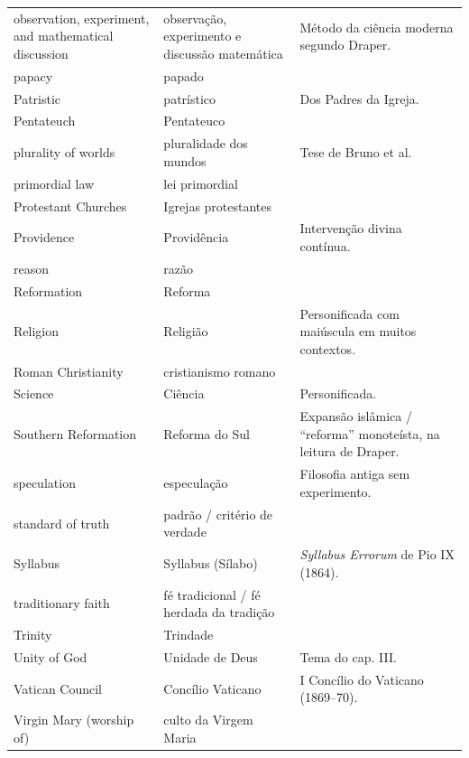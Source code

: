 \documentclass[11pt,a5paper,twoside,openany]{book}
\begin{document}
\begin{longtable}{p{} | p{} | p{}}
observation, experiment, and mathematical discussion & observação, experimento e discussão matemática & Método da ciência moderna segundo Draper. \\
papacy & papado &  \\
Patristic & patrístico & Dos Padres da Igreja. \\
Pentateuch & Pentateuco &  \\
plurality of worlds & pluralidade dos mundos & Tese de Bruno et al. \\
primordial law & lei primordial &  \\
Protestant Churches & Igrejas protestantes &  \\
Providence & Providência & Intervenção divina contínua. \\
reason & razão &  \\
Reformation & Reforma &  \\
Religion & Religião & Personificada com maiúscula em muitos contextos. \\
Roman Christianity & cristianismo romano &  \\
Science & Ciência & Personificada. \\
Southern Reformation & Reforma do Sul & Expansão islâmica / “reforma” monoteísta, na leitura de Draper. \\
speculation & especulação & Filosofia antiga sem experimento. \\
standard of truth & padrão / critério de verdade &  \\
Syllabus & Syllabus (Sílabo) & \textit{Syllabus Errorum} de Pio IX (1864). \\
traditionary faith & fé tradicional / fé herdada da tradição &  \\
Trinity & Trindade &  \\
Unity of God & Unidade de Deus & Tema do cap. III. \\
Vatican Council & Concílio Vaticano & I Concílio do Vaticano (1869–70). \\
Virgin Mary (worship of) & culto da Virgem Maria &  \\
\end{longtable}
\end{document}
